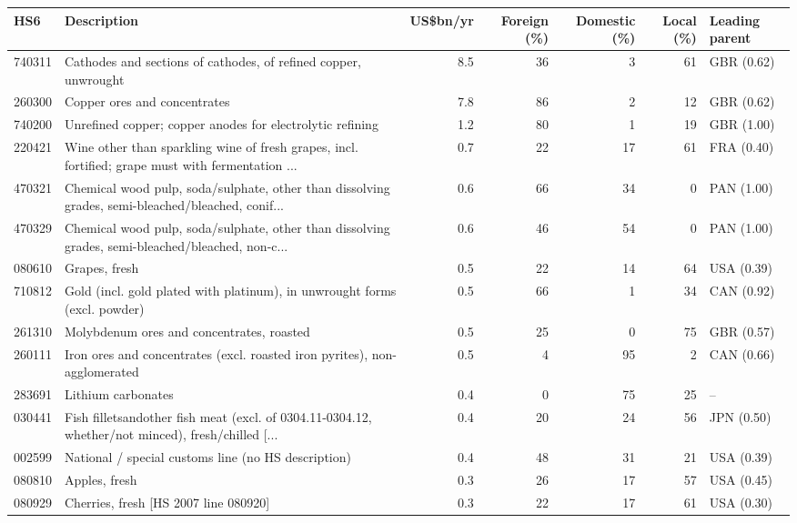 \begin{tabular}{@{}l p{6.4cm} r r r r l@{}}
\toprule
HS6 & Description & US\$bn/yr & Foreign (\%) & Domestic (\%) & Local (\%) & Leading parent \\
\midrule
740311 & Cathodes and sections of cathodes, of refined copper, unwrought & 8.5 & 36 & 3 & 61 & GBR (0.62) \\
260300 & Copper ores and concentrates & 7.8 & 86 & 2 & 12 & GBR (0.62) \\
740200 & Unrefined copper; copper anodes for electrolytic refining & 1.2 & 80 & 1 & 19 & GBR (1.00) \\
220421 & Wine other than sparkling wine of fresh grapes, incl. fortified; grape must with fermentation ... & 0.7 & 22 & 17 & 61 & FRA (0.40) \\
470321 & Chemical wood pulp, soda/\allowbreak{}sulphate, other than dissolving grades, semi-bleached/\allowbreak{}bleached, conif... & 0.6 & 66 & 34 & 0 & PAN (1.00) \\
470329 & Chemical wood pulp, soda/\allowbreak{}sulphate, other than dissolving grades, semi-bleached/\allowbreak{}bleached, non-c... & 0.6 & 46 & 54 & 0 & PAN (1.00) \\
080610 & Grapes, fresh & 0.5 & 22 & 14 & 64 & USA (0.39) \\
710812 & Gold (incl. gold plated with platinum), in unwrought forms (excl. powder) & 0.5 & 66 & 1 & 34 & CAN (0.92) \\
261310 & Molybdenum ores and concentrates, roasted & 0.5 & 25 & 0 & 75 & GBR (0.57) \\
260111 & Iron ores and concentrates (excl. roasted iron pyrites), non-agglomerated & 0.5 & 4 & 95 & 2 & CAN (0.66) \\
283691 & Lithium carbonates & 0.4 & 0 & 75 & 25 & -- \\
030441 & Fish filletsandother fish meat (excl. of 0304.11-0304.12, whether/\allowbreak{}not minced), fresh/\allowbreak{}chilled [... & 0.4 & 20 & 24 & 56 & JPN (0.50) \\
002599 & National /\allowbreak{} special customs line (no HS description) & 0.4 & 48 & 31 & 21 & USA (0.39) \\
080810 & Apples, fresh & 0.3 & 26 & 17 & 57 & USA (0.45) \\
080929 & Cherries, fresh [HS 2007 line 080920] & 0.3 & 22 & 17 & 61 & USA (0.30) \\
\bottomrule
\end{tabular}
